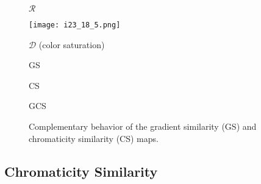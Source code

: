 \begin{figure*}[htb]
\begin{minipage}[b]{0.19\linewidth}
\centerline{$\mathcal{R}$}
\end{minipage}
\begin{minipage}[b]{0.19\linewidth}
  \centering
  \centerline{\texttt{[image: i23\_18\_5.png]}}
  \vspace{0.10cm}
\centerline{$\mathcal{D}$ (color saturation)}
\end{minipage}
\begin{minipage}[b]{0.19\linewidth}
  \centering
  \centerline{}
\vspace{0.10cm}
\centerline{GS}
\end{minipage}
\begin{minipage}[b]{0.19\linewidth}
  \centering
  \centerline{}
\vspace{0.10cm}
\centerline{CS}
\end{minipage}
\begin{minipage}[b]{.19\linewidth}
  \centering
  \centerline{}
\vspace{0.10cm}
\centerline{GCS}
\end{minipage}
\caption{Complementary behavior of the gradient similarity (GS) and chromaticity similarity (CS) maps.}
\label{fig:out1}
\end{figure*}


\subsection{Chromaticity Similarity}
\label{Chromaticity}

